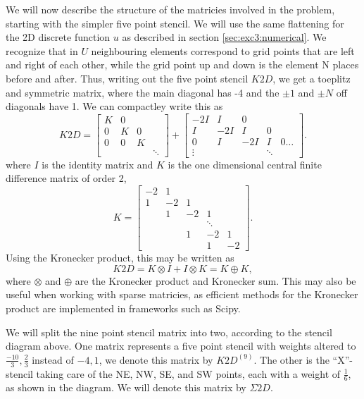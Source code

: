 We will now describe the structure of the matricies involved in the problem, starting with the simpler five point stencil.
We will use the same flattening for the 2D discrete function $u$ as described in section \ref{sec:exc3:numerical}.
We recognize that in $U$ neighbouring elements correspond to grid points that are left and right of each other, while the grid point up and down is the element N places before and after.
Thus, writing out the five point stencil $K2D$, we get a toeplitz and symmetric matrix, where the main diagonal has -4 and the $\pm 1$ and $\pm N$ off diagonals have 1.
We can compactley write this as
$$
K2D =
\begin{bmatrix}
  K & 0 \\
  0 & K & 0\\
  0 & 0 & K \\
  &&&\ddots
\end{bmatrix}
+
\begin{bmatrix}
  -2I & I & 0 &  \\
  I & -2I & I & 0 \\
  0 & I & -2I & I & 0 \dots\\
  \vdots&&&\ddots
\end{bmatrix}.
$$
where $I$ is the identity matrix and $K$ is the one dimensional central finite difference matrix of order 2,
$$
K =
\begin{bmatrix}
  -2 & 1 &   \\
  1 & -2 & 1 &  \\
  & 1 & -2 & 1 & \\
  &&&\ddots\\
  && 1 & -2 & 1\\
  &&& 1 & -2
\end{bmatrix}.
$$
Using the Kronecker product, this may be written as
$$
K2D = K \otimes I + I \otimes K = K \oplus K,
$$
where $\otimes$ and $\oplus$ are the Kronecker product and Kronecker sum.
This may also be useful when working with sparse matricies, as efficient methods for the Kronecker product are implemented in frameworks such as Scipy\cite{scipy_kron}.

We will split the nine point stencil matrix into two, according to the stencil diagram above.
One matrix represents a five point stencil with weights altered to $\frac{-10}{3}, \frac23$ instead of $-4, 1$, we denote this matrix by $K2D^{(9)}$.
The other is the ``X''-stencil taking care of the NE, NW, SE, and SW points, each with a weight of $\frac16$, as shown in the diagram.
We will denote this matrix by $\Sigma 2D$.

